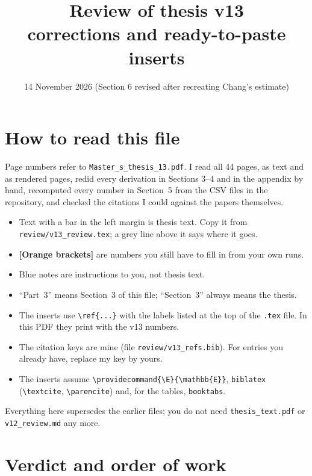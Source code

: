 \documentclass[11pt]{article}
\title{Review of thesis v13\\[2pt]\large corrections and ready-to-paste inserts}
\date{14 November 2026 (Section 6 revised after recreating Chang's estimate)}
\providecommand{\E}{\mathbb{E}}
\newcommand{\ph}[1]{\textcolor{orange!85!black}{\textbf{[#1]}}}
\theoremstyle{plain}
\theoremstyle{remark}
\begin{document}
\sloppy
\maketitle
\vspace{-2.5em}

\section*{How to read this file}
Page numbers refer to \texttt{Master\_s\_thesis\_13.pdf}. I read all 44 pages, as
text and as rendered pages, redid every derivation in Sections 3--4 and in the
appendix by hand, recomputed every number in Section~5 from the CSV files in the
repository, and checked the citations I could against the papers themselves.
\begin{itemize}
\item Text with a bar in the left margin is thesis text. Copy it from
  \texttt{review/v13\_review.tex}; a grey line above it says where it goes.
\item \ph{Orange brackets} are numbers you still have to fill in from your own runs.
\item Blue notes are instructions to you, not thesis text.
\item ``Part~3'' means Section~3 of this file; ``Section~3'' always means the
  thesis.
\item The inserts use \verb|\ref{...}| with the labels listed at the top of the
  \texttt{.tex} file. In this PDF they print with the v13 numbers.
\item The citation keys are mine (file \texttt{review/v13\_refs.bib}). For
  entries you already have, replace my key by yours.
\item The inserts assume \verb|\providecommand{\E}{\mathbb{E}}|, \texttt{biblatex}
  (\verb|\textcite|, \verb|\parencite|) and, for the tables, \texttt{booktabs}.
\end{itemize}
Everything here supersedes the earlier files; you do not need
\texttt{thesis\_text.pdf} or \texttt{v12\_review.md} any more.

\tableofcontents

\section{Verdict and order of work}
\end{document}
